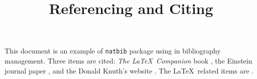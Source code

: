 \documentclass{article}
\title{\textbf{Referencing and Citing}}
\date{}
\begin{document}
\maketitle

This document is an example of \texttt{natbib} package using in bibliography 
management. Three items are cited: \textit{The \LaTeX\ Companion} book \cite{latexcompanion}, the Einstein journal paper \citet{einstein}, and the 
Donald Knuth's website \cite{knuthwebsite}. The \LaTeX\ related items are
\cite{latexcompanion,knuthwebsite}. 

\medskip


\end{document}
